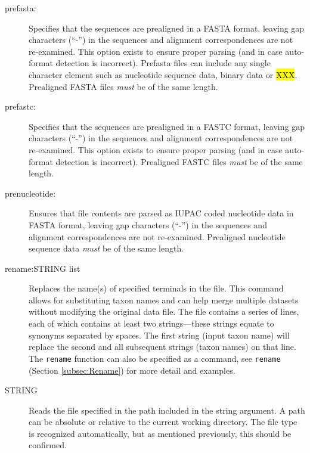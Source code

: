 \begin{description}
		\item [prefasta:] Specifies that the sequences are prealigned in a FASTA format, leaving 
		gap characters (``-'') in the sequences and alignment correspondences are not re-examined. 
		This option exists to ensure proper parsing (and in case auto-format detection is incorrect).
		Prefasta files can include any single character element such as nucleotide sequence data, 
		binary data or \hl{XXX}. Prealigned FASTA files \textit{must} be of the same length. 
			
		\item [prefastc:] Specifies that the sequences are prealigned in a FASTC format, leaving gap 
		characters (``-'') in the sequences and alignment correspondences are not re-examined. 
		This option exists to ensure proper parsing (and in case auto-format detection is incorrect).
		Prealigned FASTC files \textit{must} be of the same length.			
		
		\item [prenucleotide:] Ensures that file contents are parsed as IUPAC coded nucleotide data 
		in FASTA \citep{PearsonandLipman1988} format, leaving gap characters (``-'') in the sequences 
		and alignment correspondences are not re-examined. Prealigned nucleotide sequence data 
		\textit{must} be of the same length.
		
		\item [rename:STRING list] Replaces the name(s) of specified terminals in the file. This 
		command allows for substituting taxon names and can help merge multiple datasets without 
		modifying the original data file. The file contains a series of lines, each of which contains at 
		least two strings---these strings equate to synonyms separated by spaces. The first string 
		(input taxon name) will replace the second and all subsequent strings (taxon names) on 
		that line. The \texttt{rename} function can also be specified as a command, see \texttt{rename}
		(Section \ref{subsec:Rename}) for more detail and examples.
					 
		\item[STRING] Reads the file specified in the path included in the string argument. A path 
		can be absolute or relative to the current working directory. The file type is recognized
		automatically, but as mentioned previously, this should be confirmed.


\end{description}
